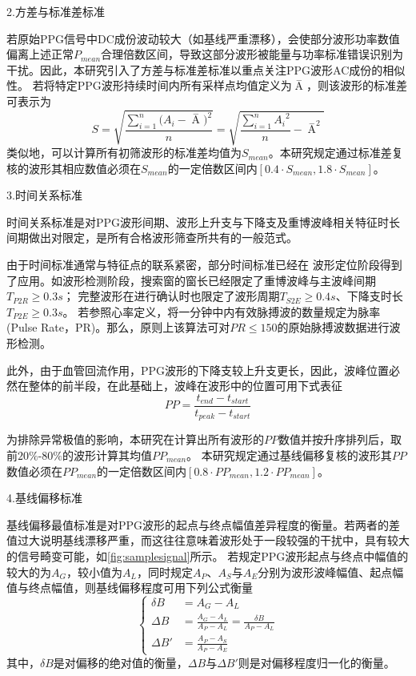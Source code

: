 2.方差与标准差标准

若原始PPG信号中DC成份波动较大（如基线严重漂移），会使部分波形功率数值偏离上述正常$P_{mean}$合理倍数区间，导致这部分波形被能量与功率标准错误识别为干扰。因此，本研究引入了方差与标准差标准以重点关注PPG波形AC成份的相似性。
若将特定PPG波形持续时间内所有采样点均值定义为$\mathop{A} \limits^-$，则该波形的标准差可表示为
\begin{equation}
    \label{equ:ppgstd}
    S=\sqrt{\frac{\sum_{i=1}^{n}{(A_i-\mathop{A} \limits^-})^2}{n}}=\sqrt{\frac{\sum_{i=1}^n{A_i}^2}{n}-{\mathop{A} \limits^-}^2}
\end{equation}
类似地，可以计算所有初筛波形的标准差均值为$S_{mean}$。本研究规定通过标准差复核的波形其相应数值必须在$S_{mean}$的一定倍数区间内$[0.4 \cdot S_{mean},1.8 \cdot S_{mean}]$。

3.时间关系标准

时间关系标准是对PPG波形间期、波形上升支与下降支及重博波峰相关特征时长间期做出对限定，是所有合格波形筛查所共有的一般范式。

由于时间标准通常与特征点的联系紧密，部分时间标准已经在
波形定位阶段得到了应用。如波形检测阶段，搜索窗的窗长已经限定了重博波峰与主波峰间期$T_{P2R}\ge0.3s$；
完整波形在进行确认时也限定了波形周期$T_{S2E}\ge 0.4s$、下降支时长$T_{P2E}\ge 0.3s$。
若参照心率定义，将一分钟中内有效脉搏波的数量规定为脉率(Pulse Rate，PR)。那么，原则上该算法可对$PR \le 150$的原始脉搏波数据进行波形检测。

此外，由于血管回流作用，PPG波形的下降支较上升支更长，因此，波峰位置必然在整体的前半段，在此基础上，波峰在波形中的位置可用下式表征
\begin{equation}
    \label{equ:timestd}
    PP = \frac{t_{end}-t_{start}}{t_{peak}-t_{start}}
\end{equation}

为排除异常极值的影响，本研究在计算出所有波形的$PP$数值并按升序排列后，取前$20\%$-$80\%$的波形计算其均值${PP}_{mean}$。
本研究规定通过基线偏移复核的波形其$PP$数值必须在${PP}_{mean}$的一定倍数区间内$[0.8 \cdot {PP}_{mean},1.2 \cdot {PP}_{mean}]$。

4.基线偏移标准

基线偏移最值标准是对PPG波形的起点与终点幅值差异程度的衡量。若两者的差值过大说明基线漂移严重，而这往往意味着波形处于一段较强的干扰中，具有较大的信号畸变可能，如\autoref{fig:samplesignal}所示。
若规定PPG波形起点与终点中幅值的较大的为$A_G$，较小值为$A_L$，同时规定$A_P$、$A_S$与$A_E$分别为波形波峰幅值、起点幅值与终点幅值，则基线偏移程度可用下列公式衡量
\begin{equation}
    \label{equ:baselinestd}
    \left \{
    \begin{aligned}
        \delta B &=A_G-A_L \\
        \Delta B &=\frac{A_G-A_L}{A_P-A_L}=\frac{\delta B}{A_P-A_L}\\
        \Delta B' &=\frac{A_P-A_S}{A_P-A_E}
    \end{aligned}
    \right.
\end{equation}
其中，$\delta B$是对偏移的绝对值的衡量，$\Delta B$与$\Delta B'$则是对偏移程度归一化的衡量。

